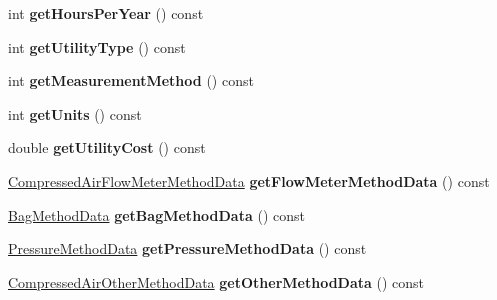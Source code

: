 \begin{DoxyCompactItemize}
\item 
\mbox{\label{class_compressed_air_reduction_input_a7081f6958226f9e63330c5238a8d8e2b}} 
int {\bfseries get\+Hours\+Per\+Year} () const
\item 
\mbox{\label{class_compressed_air_reduction_input_a94e2975b61c875643a3b3b6d5eb3112b}} 
int {\bfseries get\+Utility\+Type} () const
\item 
\mbox{\label{class_compressed_air_reduction_input_a88e82bcb0399fb29044e77f11384f439}} 
int {\bfseries get\+Measurement\+Method} () const
\item 
\mbox{\label{class_compressed_air_reduction_input_ab4368f51ab9bc08a80dae0e9727da3fb}} 
int {\bfseries get\+Units} () const
\item 
\mbox{\label{class_compressed_air_reduction_input_a53503e7e8b40c79144100e7e23a029d1}} 
double {\bfseries get\+Utility\+Cost} () const
\item 
\mbox{\label{class_compressed_air_reduction_input_a86a26c458e9d31bb212e341ced01573b}} 
\hyperlink{class_compressed_air_flow_meter_method_data}{Compressed\+Air\+Flow\+Meter\+Method\+Data} {\bfseries get\+Flow\+Meter\+Method\+Data} () const
\item 
\mbox{\label{class_compressed_air_reduction_input_ab781dbcec839e6b8a88de77ab8b0773f}} 
\hyperlink{class_bag_method_data}{Bag\+Method\+Data} {\bfseries get\+Bag\+Method\+Data} () const
\item 
\mbox{\label{class_compressed_air_reduction_input_af2fb0dba0ce5b923800eaea5545c2b1c}} 
\hyperlink{class_pressure_method_data}{Pressure\+Method\+Data} {\bfseries get\+Pressure\+Method\+Data} () const
\item 
\mbox{\label{class_compressed_air_reduction_input_a99e59b1df80be318f98140e62368fee7}} 
\hyperlink{class_compressed_air_other_method_data}{Compressed\+Air\+Other\+Method\+Data} {\bfseries get\+Other\+Method\+Data} () const

\end{DoxyCompactItemize}
